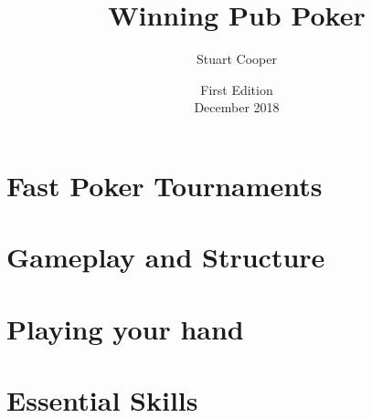 \documentclass{book}
\begin{document}



\title{Winning Pub Poker}
\author{Stuart Cooper}
\date{First Edition\\December 2018}


\maketitle
\tableofcontents



\part{Fast Poker Tournaments}





\part{Gameplay and Structure}



\part{Playing your hand}




\part{Essential Skills}




% 






\end{document}
